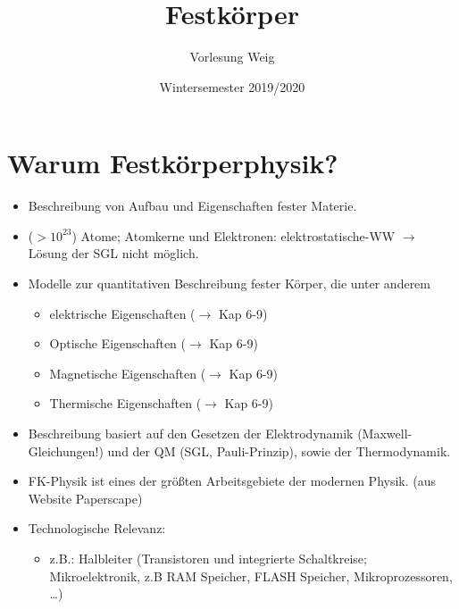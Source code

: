 


\title{Festkörper}
\author{Vorlesung Weig}
\date{Wintersemester 2019/2020}



\maketitle \newpage
\tableofcontents
\newpage

\section*{Warum Festkörperphysik?}
	\begin{itemize}
	    \item Beschreibung von Aufbau und Eigenschaften fester Materie.
	    \item ($>10^{23}$) Atome; Atomkerne und Elektronen: elektrostatische-WW $ \rightarrow $ Lösung der SGL nicht möglich.
	    \item Modelle zur quantitativen Beschreibung fester Körper, die unter anderem
	    \begin{itemize}
	        \item elektrische Eigenschaften ($\rightarrow$ Kap 6-9)%
	        \item Optische Eigenschaften ($\rightarrow$ Kap 6-9)%
	        \item Magnetische Eigenschaften ($\rightarrow$ Kap 6-9)%
	        \item Thermische Eigenschaften ($\rightarrow$ Kap 6-9)%
	    \end{itemize}
	    \item Beschreibung basiert auf den Gesetzen der Elektrodynamik (Maxwell-Gleichungen!) und der QM (SGL, Pauli-Prinzip), sowie der Thermodynamik.
	    \item FK-Physik ist eines der größten Arbeitsgebiete der modernen Physik. (aus Website Paperscape)
	    \item Technologische Relevanz:
	    \begin{itemize}
	        \item z.B.: Halbleiter (Transistoren und integrierte Schaltkreise; Mikroelektronik, z.B RAM Speicher, FLASH Speicher, Mikroprozessoren, \dots)

\end{itemize}
\end{itemize}
